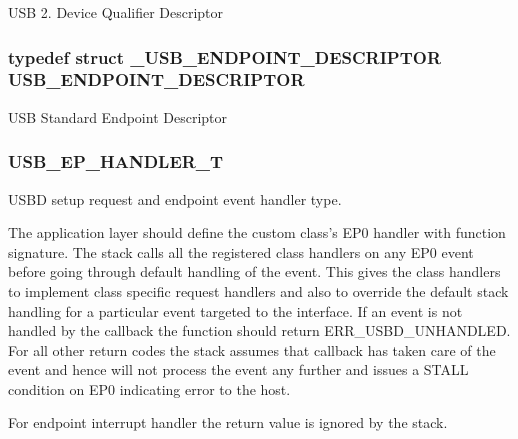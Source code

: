 U\-S\-B 2. Device Qualifier Descriptor \hypertarget{group__USBD__Core_ga652b2871268bd903653cbff0f3448a6e}{
\subsubsection[{U\-S\-B\-\_\-\-E\-N\-D\-P\-O\-I\-N\-T\-\_\-\-D\-E\-S\-C\-R\-I\-P\-T\-O\-R}]{\setlength{\rightskip}{0pt plus 5cm}typedef struct {\bf \-\_\-\-U\-S\-B\-\_\-\-E\-N\-D\-P\-O\-I\-N\-T\-\_\-\-D\-E\-S\-C\-R\-I\-P\-T\-O\-R} {\bf U\-S\-B\-\_\-\-E\-N\-D\-P\-O\-I\-N\-T\-\_\-\-D\-E\-S\-C\-R\-I\-P\-T\-O\-R}}}\label{group__USBD__Core_ga652b2871268bd903653cbff0f3448a6e}
U\-S\-B Standard Endpoint Descriptor \hypertarget{group__USBD__Core_gaa578d29a85226108ef62c6d5c325b742}{
\subsubsection[{U\-S\-B\-\_\-\-E\-P\-\_\-\-H\-A\-N\-D\-L\-E\-R\-\_\-\-T}]{\setlength{\rightskip}{0pt plus 5cm}U\-S\-B\-\_\-\-E\-P\-\_\-\-H\-A\-N\-D\-L\-E\-R\-\_\-\-T}}\label{group__USBD__Core_gaa578d29a85226108ef62c6d5c325b742}


U\-S\-B\-D setup request and endpoint event handler type. 

The application layer should define the custom class's E\-P0 handler with function signature. The stack calls all the registered class handlers on any E\-P0 event before going through default handling of the event. This gives the class handlers to implement class specific request handlers and also to override the default stack handling for a particular event targeted to the interface. If an event is not handled by the callback the function should return E\-R\-R\-\_\-\-U\-S\-B\-D\-\_\-\-U\-N\-H\-A\-N\-D\-L\-E\-D. For all other return codes the stack assumes that callback has taken care of the event and hence will not process the event any further and issues a S\-T\-A\-L\-L condition on E\-P0 indicating error to the host. \par
For endpoint interrupt handler the return value is ignored by the stack. \par

